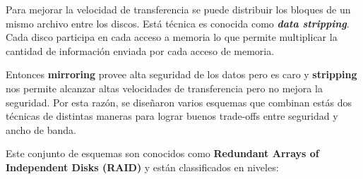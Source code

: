 Para mejorar la velocidad de transferencia se puede distribuir los bloques de un mismo archivo entre los discos. Está técnica es conocida como \textbf{\textit{data stripping}}. Cada disco participa en cada acceso a memoria 
lo que permite multiplicar la cantidad de información enviada por cada acceso de memoria.

Entonces \textbf{mirroring} provee alta seguridad de los datos pero es caro y \textbf{stripping} nos permite alcanzar altas velocidades de transferencia pero no mejora la seguridad. Por esta razón, se diseñaron varios esquemas que combinan estás dos técnicas de distintas maneras para lograr buenos trade-offs entre seguridad y ancho de banda.

Este conjunto de esquemas son conocidos como \textbf{Redundant Arrays of Independent Disks (RAID)} y están classificados en niveles:


